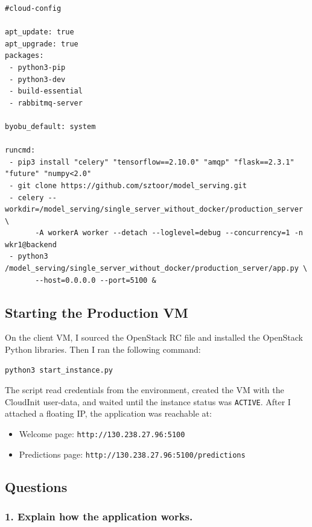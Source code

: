 \documentclass[11pt,a4paper]{article}
\begin{document}
\begin{lstlisting}[style=yaml, caption={cloud-cfg.txt -- single server without Docker}]
#cloud-config

apt_update: true
apt_upgrade: true
packages:
 - python3-pip
 - python3-dev
 - build-essential
 - rabbitmq-server

byobu_default: system

runcmd:
 - pip3 install "celery" "tensorflow==2.10.0" "amqp" "flask==2.3.1" "future" "numpy<2.0"
 - git clone https://github.com/sztoor/model_serving.git
 - celery --workdir=/model_serving/single_server_without_docker/production_server \
       -A workerA worker --detach --loglevel=debug --concurrency=1 -n wkr1@backend
 - python3 /model_serving/single_server_without_docker/production_server/app.py \
       --host=0.0.0.0 --port=5100 &
\end{lstlisting}

\subsection{Starting the Production VM}

On the client VM, I sourced the OpenStack RC file and installed the OpenStack Python
libraries. Then I ran the following command:

\begin{lstlisting}[style=shell, caption={Starting the production VM from the client}]
python3 start_instance.py
\end{lstlisting}

The script read credentials from the environment, created the VM with the
CloudInit user-data, and waited until the instance status was \texttt{ACTIVE}.
After I attached a floating IP, the application was reachable at:

\begin{itemize}[leftmargin=1.5cm]
  \item Welcome page: \texttt{http://130.238.27.96:5100}
  \item Predictions page: \texttt{http://130.238.27.96:5100/predictions}
\end{itemize}

\subsection{Questions}

\subsubsection*{1. Explain how the application works.}
\end{document}
